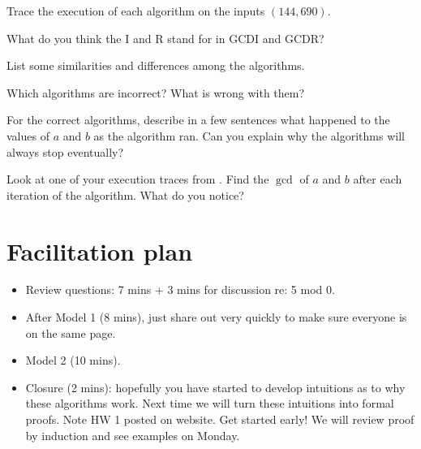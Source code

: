 \documentclass{tufte-handout}
\begin{document}
\begin{questions}
\item \label{q:trace} Trace the execution of each algorithm on the inputs
  $(144,690)$.
\end{questions}

\newpage
\begin{questions}
\item What do you think the \textsf{I} and \textsf{R} stand for in
  \textsf{GCDI} and \textsf{GCDR}?
\item List some similarities and differences among the algorithms.
\item Which algorithms are incorrect?  What is wrong with them?
\item For the correct algorithms, describe in a few sentences what
  happened to the values of $a$ and $b$ as the algorithm ran.  Can you
  explain why the algorithms will always stop eventually?
\item Look at one of your execution traces from .  Find
  the $\gcd$ of $a$ and $b$ after each iteration of the algorithm.
  What do you notice?
\end{questions}

\newpage

\section{Facilitation plan}
\label{sec:facilitation}

\begin{itemize}
\item Review questions: 7 mins + 3 mins for discussion re: 5 mod 0.

\item After Model 1 (8 mins), just share out very quickly to make sure
  everyone is on the same page.

\item Model 2 (10 mins).

\item Closure (2 mins): hopefully you have started to develop
  intuitions as to why these algorithms work.  Next time we will turn
  these intuitions into formal proofs.  Note HW 1 posted on website.
  Get started early!  We will review proof by induction and see
  examples on Monday.

\end{itemize}
\end{document}
